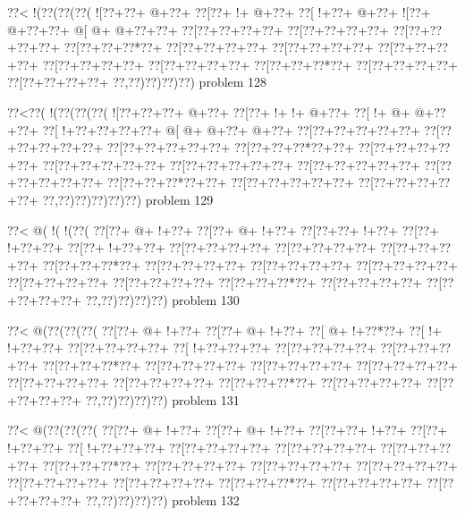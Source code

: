 \vbox{\vbox{\goo
\0??<\- !(\0??(\0??(\0??(
\- ![\0??+\0??+\- @+\0??+
\0??[\0??+\- !+\- @+\0??+
\0??[\- !+\0??+\- @+\0??+
\- ![\0??+\- @+\0??+\0??+
\- @[\- @+\- @+\0??+\0??+
\0??[\0??+\0??+\0??+\0??+
\0??[\0??+\0??+\0??+\0??+
\0??[\0??+\0??+\0??+\0??+
\0??[\0??+\0??+\0??*\0??+
\0??[\0??+\0??+\0??+\0??+
\0??[\0??+\0??+\0??+\0??+
\0??[\0??+\0??+\0??+\0??+
\0??[\0??+\0??+\0??+\0??+
\0??[\0??+\0??+\0??+\0??+
\0??[\0??+\0??+\0??*\0??+
\0??[\0??+\0??+\0??+\0??+
\0??[\0??+\0??+\0??+\0??+
\0??,\0??)\0??)\0??)\0??)
}
\hfil problem 128\hfil\break
}

\vbox{\vbox{\goo
\0??<\0??(\- !(\0??(\0??(\0??(
\- ![\0??+\0??+\0??+\- @+\0??+
\0??[\0??+\- !+\- !+\- @+\0??+
\0??[\- !+\- @+\- @+\0??+\0??+
\0??[\- !+\0??+\0??+\0??+\0??+
\- @[\- @+\- @+\0??+\- @+\0??+
\0??[\0??+\0??+\0??+\0??+\0??+
\0??[\0??+\0??+\0??+\0??+\0??+
\0??[\0??+\0??+\0??+\0??+\0??+
\0??[\0??+\0??+\0??*\0??+\0??+
\0??[\0??+\0??+\0??+\0??+\0??+
\0??[\0??+\0??+\0??+\0??+\0??+
\0??[\0??+\0??+\0??+\0??+\0??+
\0??[\0??+\0??+\0??+\0??+\0??+
\0??[\0??+\0??+\0??+\0??+\0??+
\0??[\0??+\0??+\0??*\0??+\0??+
\0??[\0??+\0??+\0??+\0??+\0??+
\0??[\0??+\0??+\0??+\0??+\0??+
\0??,\0??)\0??)\0??)\0??)\0??)
}
\hfil problem 129\hfil\break
}

\vbox{\vbox{\goo
\0??<\- @(\- !(\- !(\0??(
\0??[\0??+\- @+\- !+\0??+
\0??[\0??+\- @+\- !+\0??+
\0??[\0??+\0??+\- !+\0??+
\0??[\0??+\- !+\0??+\0??+
\0??[\0??+\- !+\0??+\0??+
\0??[\0??+\0??+\0??+\0??+
\0??[\0??+\0??+\0??+\0??+
\0??[\0??+\0??+\0??+\0??+
\0??[\0??+\0??+\0??*\0??+
\0??[\0??+\0??+\0??+\0??+
\0??[\0??+\0??+\0??+\0??+
\0??[\0??+\0??+\0??+\0??+
\0??[\0??+\0??+\0??+\0??+
\0??[\0??+\0??+\0??+\0??+
\0??[\0??+\0??+\0??*\0??+
\0??[\0??+\0??+\0??+\0??+
\0??[\0??+\0??+\0??+\0??+
\0??,\0??)\0??)\0??)\0??)
}
\hfil problem 130\hfil\break
}

\vbox{\vbox{\goo
\0??<\- @(\0??(\0??(\0??(
\0??[\0??+\- @+\- !+\0??+
\0??[\0??+\- @+\- !+\0??+
\0??[\- @+\- !+\0??*\0??+
\0??[\- !+\- !+\0??+\0??+
\0??[\0??+\0??+\0??+\0??+
\0??[\- !+\0??+\0??+\0??+
\0??[\0??+\0??+\0??+\0??+
\0??[\0??+\0??+\0??+\0??+
\0??[\0??+\0??+\0??*\0??+
\0??[\0??+\0??+\0??+\0??+
\0??[\0??+\0??+\0??+\0??+
\0??[\0??+\0??+\0??+\0??+
\0??[\0??+\0??+\0??+\0??+
\0??[\0??+\0??+\0??+\0??+
\0??[\0??+\0??+\0??*\0??+
\0??[\0??+\0??+\0??+\0??+
\0??[\0??+\0??+\0??+\0??+
\0??,\0??)\0??)\0??)\0??)
}
\hfil problem 131\hfil\break
}

\vbox{\vbox{\goo
\0??<\- @(\0??(\0??(\0??(
\0??[\0??+\- @+\- !+\0??+
\0??[\0??+\- @+\- !+\0??+
\0??[\0??+\0??+\- !+\0??+
\0??[\0??+\- !+\0??+\0??+
\0??[\- !+\0??+\0??+\0??+
\0??[\0??+\0??+\0??+\0??+
\0??[\0??+\0??+\0??+\0??+
\0??[\0??+\0??+\0??+\0??+
\0??[\0??+\0??+\0??*\0??+
\0??[\0??+\0??+\0??+\0??+
\0??[\0??+\0??+\0??+\0??+
\0??[\0??+\0??+\0??+\0??+
\0??[\0??+\0??+\0??+\0??+
\0??[\0??+\0??+\0??+\0??+
\0??[\0??+\0??+\0??*\0??+
\0??[\0??+\0??+\0??+\0??+
\0??[\0??+\0??+\0??+\0??+
\0??,\0??)\0??)\0??)\0??)
}
\hfil problem 132\hfil\break
}

